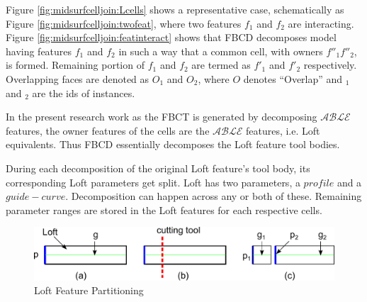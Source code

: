 Figure \ref{fig:midsurfcelljoin:Lcells} shows a representative case, schematically as Figure \ref{fig:midsurfcelljoin:twofeat}, where two features $f_1$ and $f_2$ are interacting. 
Figure \ref{fig:midsurfcelljoin:featinteract} shows that FBCD decomposes model having features $f_1$ and $f_2$ in such a way that a common cell, with owners $f''_1f''_2$, is formed. Remaining portion of $f_1$ and $f_2$ are termed as $f'_1$ and $f'_2$ respectively.  Overlapping faces are denoted as $O_1$ and $O_2$, where $O$ denotes ``Overlap'' and $_1$ and $_2$ are the ids of instances. 

In the present research work as the FBCT is generated by decomposing $\mathcal{ABLE}$ features, the owner features of the cells are the $\mathcal{ABLE}$ features, i.e. Loft equivalents. Thus FBCD essentially decomposes the Loft feature tool bodies.

During each decomposition of the original Loft feature's tool body, its corresponding Loft parameters get split. Loft has two parameters, a $profile$ and a $guide-curve$. Decomposition can happen across any or both of these. Remaining parameter ranges are stored in the Loft features for each respective cells.



  \begin{figure}[!h]
\centering     %
\includegraphics[width=0.75\linewidth,valign=t]{../Common/images/loftbeforecdsweep}
\caption{Loft Feature Partitioning}
\label{fig:midsurfcelljoin:loftbeforecdsweep}
\end{figure}

